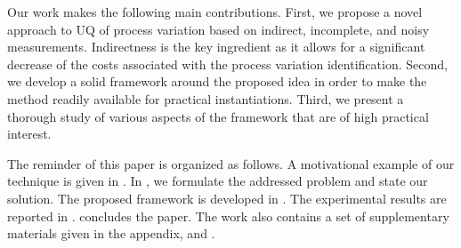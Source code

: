 Our work makes the following main contributions. First, we propose a novel approach to UQ of process variation based on indirect, incomplete, and noisy measurements. Indirectness is the key ingredient as it allows for a significant decrease of the costs associated with the process variation identification. Second, we develop a solid framework around the proposed idea in order to make the method readily available for practical instantiations. Third, we present a thorough study of various aspects of the framework that are of high practical interest.

The reminder of this paper is organized as follows. A motivational example of our technique is given in . In , we formulate the addressed problem and state our solution. The proposed framework is developed in . The experimental results are reported in .  concludes the paper. The work also contains a set of supplementary materials given in the appendix,  and .
